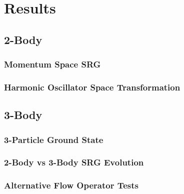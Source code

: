 \chapter{Results}

\section{2-Body}

\subsection{Momentum Space SRG}

\subsection{Harmonic Oscillator Space Transformation}

\section{3-Body}

\subsection{3-Particle Ground State}

\subsection{2-Body vs 3-Body SRG Evolution}

\subsection{Alternative Flow Operator Tests}
